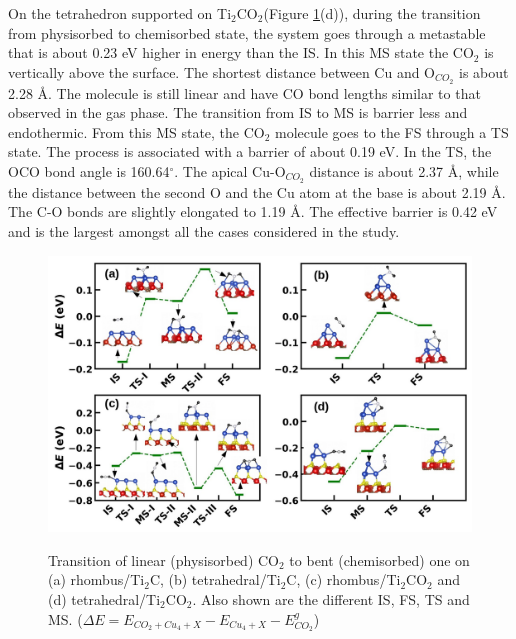 On the tetrahedron supported on Ti$_2$CO$_2$(Figure \ref{fig:neb_co2}(d)), during the transition from physisorbed to 
chemisorbed state, the system goes through a metastable that is about 0.23 eV higher
in energy than the IS. In this MS state the CO$_2$ is vertically above the surface. The shortest
distance between Cu and O$_{CO_2}$ is about 2.28 \AA. The molecule is still linear and have
CO bond lengths similar to that observed in the gas phase. The transition from IS to MS
is barrier less and endothermic. From this MS state, the CO$_2$
molecule goes to the FS through a TS state. The process is associated with a barrier of about 0.19 eV. In the TS, the OCO bond angle is 160.64$^\circ$. The apical Cu-O$_{CO_2}$ distance is 
about 2.37 \AA, while the distance between the second O and the Cu atom at the base is about
2.19 \AA. The C-O bonds are slightly elongated to 1.19 \AA. The effective barrier is 0.42 eV
and is the largest amongst all the cases considered in the study.

\begin{figure}[ht]
 \begin{center}	
    \includegraphics[width=12cm]{./Appendix2/Appendix2_figures/neb_co2.jpg} \\[0cm]
 \end{center}
 \caption{Transition of linear (physisorbed) CO$_2$ to bent (chemisorbed) one on (a) rhombus/Ti$_2$C,
 (b) tetrahedral/Ti$_2$C, (c) rhombus/Ti$_2$CO$_2$ and (d) tetrahedral/Ti$_2$CO$_2$. Also shown are
 the different IS, FS, TS and MS. ($\Delta E= E_{CO_2+Cu_4+X}-E_{Cu_{4}+X} - E^{g}_{CO_2}$) }
  \label{fig:neb_co2}
\end{figure}


